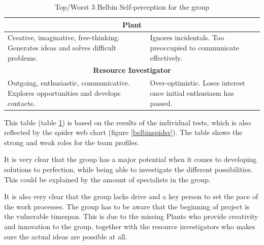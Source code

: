 \begin{table}[ht]
\begin{tabular}{|p{}|p{}|}
\multicolumn{2}{|c|}{\textbf{Plant}}                                                                                                                                         \\ \hline
Creative, imaginative, free-thinking. Generates ideas and solves difficult problems.        & Ignores incidentals. Too preoccupied to communicate effectively.             \\ \hline
\multicolumn{2}{|c|}{\textbf{Resource Investigator}}                                                                                                                         \\ \hline
Outgoing, enthusiastic, communicative. Explores opportunities and develops contacts.        & Over-optimistic. Loses interest once initial enthusiasm has passed.          \\ \hline
\end{tabular}
\caption{Top/Worst 3 Belbin Self-perception for the group}
\label{belbintable}
\end{table}

This table (table \ref{belbintable}) is based on the results of the individual tests, which is also reflected by the spider web chart (figure \ref{belbinspider}). The table shows the strong and weak roles for the team profiles.

It is very clear that the group has a major potential when it comes to developing solutions to perfection, while being able to investigate the different possibilities. This could be explained by the amount of specialists in the group.

It is also very clear that the group lacks drive and a key person to set the pace of the work processes. The group has to be aware that the beginning of project is the vulnerable timespan. This is due to the missing Plants who provide creativity and innovation to the group, together with the resource investigators who makes sure the actual ideas are possible at all.
 


